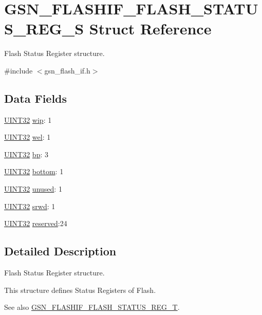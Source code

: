 \hypertarget{a00081}{
\section{GSN\_\-FLASHIF\_\-FLASH\_\-STATUS\_\-REG\_\-S Struct Reference}
\label{a00081}
}


Flash Status Register structure.  




{\ttfamily \#include $<$gsn\_\-flash\_\-if.h$>$}

\subsection*{Data Fields}
\begin{DoxyCompactItemize}
\item 
\hyperlink{a00660_gae1e6edbbc26d6fbc71a90190d0266018}{UINT32} \hyperlink{a00081_ab25d8b2ededb98f711b58b9a51b4c745}{wip}: 1
\item 
\hyperlink{a00660_gae1e6edbbc26d6fbc71a90190d0266018}{UINT32} \hyperlink{a00081_a9373c12ea65b0c6a95c219ecd87449ce}{wel}: 1
\item 
\hyperlink{a00660_gae1e6edbbc26d6fbc71a90190d0266018}{UINT32} \hyperlink{a00081_a631ad041e514005f49539055368653b2}{bp}: 3
\item 
\hyperlink{a00660_gae1e6edbbc26d6fbc71a90190d0266018}{UINT32} \hyperlink{a00081_a107dfcf188ce3d240bed82234eed974b}{bottom}: 1
\item 
\hyperlink{a00660_gae1e6edbbc26d6fbc71a90190d0266018}{UINT32} \hyperlink{a00081_a2c3ace150ddcb10d297a6d30b67d6330}{unused}: 1
\item 
\hyperlink{a00660_gae1e6edbbc26d6fbc71a90190d0266018}{UINT32} \hyperlink{a00081_a9fea0ad880f97176ec08d9806a049939}{srwd}: 1
\item 
\hyperlink{a00660_gae1e6edbbc26d6fbc71a90190d0266018}{UINT32} \hyperlink{a00081_a341b309519da31020dfc9a91cc114e0e}{reserved}:24
\end{DoxyCompactItemize}


\subsection{Detailed Description}
Flash Status Register structure. 

This structure defines Status Registers of Flash.

\begin{DoxySeeAlso}{See also}
\hyperlink{a00647_ga817ad96ff2f6956f431999227f67c3ca}{GSN\_\-FLASHIF\_\-FLASH\_\-STATUS\_\-REG\_\-T}. 
\end{DoxySeeAlso}


